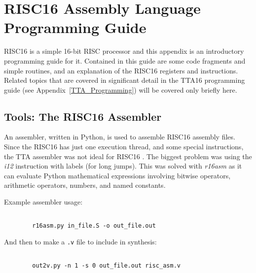 \chapter{RISC16 Assembly Language Programming Guide}
\label{RISCPROG}

RISC16 is a simple 16-bit RISC processor and this appendix is an introductory
programming guide for it. Contained in this guide are some code fragments and
simple routines, and an explanation of the RISC16 registers and instructions.
Related topics that are covered in significant detail in the TTA16 programming
guide (see Appendix~\ref{TTA_Programming}) will be covered only briefly here.


\section{Tools: The RISC16 Assembler}



An assembler, written in Python, is used to assemble RISC16 assembly files. Since
the RISC16 has just one execution thread, and some special instructions, the TTA
assembler was not ideal for RISC16 . The biggest problem was using the
\textit{i12} instruction with labels (for long jumps). This was solved with
\textit{r16asm} as it can evaluate Python mathematical expressions involving
bitwise operators, arithmetic operators, numbers, and named constants.

Example assembler usage:
\begin{verbatim}

        r16asm.py in_file.S -o out_file.out
\end{verbatim}
And then to make a \texttt{.v} file to include in synthesis:
\begin{verbatim}

        out2v.py -n 1 -s 0 out_file.out risc_asm.v
\end{verbatim}


